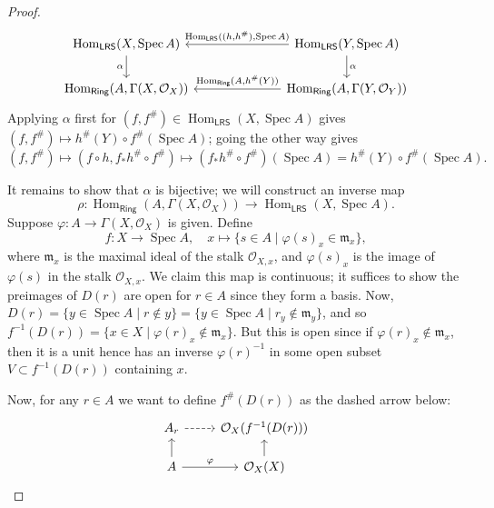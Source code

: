 \documentclass[10pt]{article}
\theoremstyle{definition}
\theoremstyle{remark}
\numberwithin{equation}{section}
\numberwithin{figure}{subsubsection}
\DeclareMathOperator{\Spec}{Spec}
\DeclareMathOperator{\Hom}{Hom}
\newcommand{\OO}{\mathcal{O}}
\newcommand{\LRS}{\mathsf{LRS}}
\newcommand{\Ring}{\mathsf{Ring}}
\begin{document}
\begin{proof}
  \begin{equation*}
    \begin{tikzcd}[column sep=16ex]
      \Hom_\mathsf{LRS}(X,\Spec A) \dar[swap]{\alpha} & \arrow{l}[swap]{\Hom_\mathsf{LRS}((h,h^\#),\Spec A)} \Hom_\mathsf{LRS}(Y,\Spec A)\dar{\alpha}\\
      \Hom_\Ring(A,\Gamma(X,\OO_X)) & \arrow{l}[swap]{\Hom_\Ring(A,h^\#(Y))} \Hom_\Ring(A,\Gamma(Y,\OO_Y))
    \end{tikzcd}
  \end{equation*}
  Applying $\alpha$ first for $(f,f^\#) \in \Hom_\LRS(X,\Spec A)$ gives $(f,f^\#) \mapsto h^\#(Y) \circ f^\#(\Spec A)$; going the other way gives
  \begin{equation*}
    (f,f^\#) \mapsto (f \circ h,f_*h^\# \circ f^\#) \mapsto (f_*h^\# \circ f^\#)(\Spec A) = h^\#(Y) \circ f^\#(\Spec A).
  \end{equation*}
  \par It remains to show that $\alpha$ is bijective; we will construct an inverse map
  \begin{equation*}
    \rho \colon \Hom_\Ring(A,\Gamma(X,\OO_X)) \to \Hom_\LRS(X,\Spec A). 
  \end{equation*}
  Suppose $\varphi\colon A \to \Gamma(X,\OO_X)$ is given. Define
  \begin{equation*}
    f\colon X \to \Spec A, \quad x \longmapsto \{s \in A \mid \varphi(s)_x \in \mathfrak{m}_x\},
  \end{equation*}
  where $\mathfrak{m}_x$ is the maximal ideal of the stalk $\OO_{X,x}$, and
  $\varphi(s)_x$ is the image of $\varphi(s)$ in the stalk $\OO_{X,x}$. We claim
  this map is continuous; it suffices to show the preimages of $D(r)$ are open
  for $r \in A$ since they form a basis. Now, $D(r) = \{y \in \Spec A \mid r
  \notin y\} = \{y \in \Spec A \mid r_y \notin \mathfrak{m}_y\}$, and so
  $f^{-1}(D(r)) = \{x \in X \mid \varphi(r)_x \notin \mathfrak{m}_x\}$. But this is open since if $\varphi(r)_x \notin \mathfrak{m}_x$, then it is a unit \cite[Cor.~1.5]{AM69} hence has an inverse $\varphi(r)^{-1}$ in some open subset $V \subset f^{-1}(D(r))$ containing $x$.
  \par Now, for any $r \in A$ we want to define $f^\#(D(r))$ as the dashed arrow below:
  \begin{equation}\label{eq4b}
    \begin{tikzcd}[row sep=scriptsize]
      A_r \rar[dashed] & \OO_X(f^{-1}(D(r)))\\
      A \uar \rar{\varphi} & \OO_X(X) \uar

\end{tikzcd}
\end{equation}
\end{proof}
\end{document}
